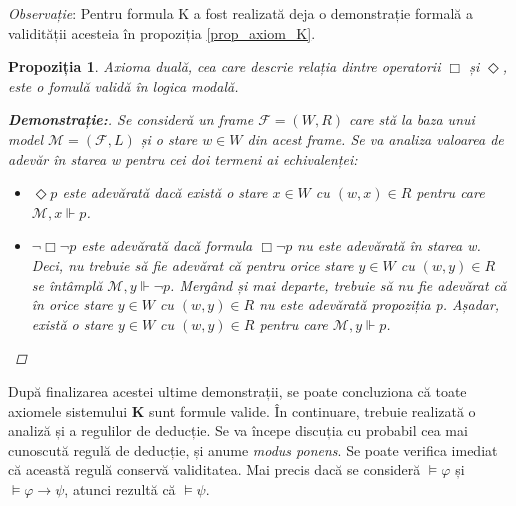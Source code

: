\documentclass[12pt, openany]{book}
\newtheorem{sentence}[definition]{Propoziția} %
\begin{document}
            \par{}
                \noindent \textit{Observație}: Pentru formula K a fost realizată deja o demonstrație formală a validității 
                acesteia în propoziția \ref{prop_axiom_K}.

            \begin{sentence}
                Axioma duală, cea care descrie relația dintre operatorii $\Box$ și $\Diamond$, este o fomulă validă în 
                logica modală.

                \begin{proof}[\textbf{Demonstrație:}]
                    Se consideră un \textit{frame} $\mathcal{F}=(W,R)$ care stă la baza unui model $\mathcal{M}=(
                    \mathcal{F},L)$ și o stare $w \in W$ din acest \textit{frame}. Se va analiza valoarea de adevăr în 
                    starea w pentru cei doi termeni ai echivalenței:
                    \begin{itemize}
                        \item $\Diamond p$ este adevărată dacă există o stare $x \in W$ cu $(w,x) \in R$ pentru care 
                        $\mathcal{M},x \Vdash p$.
                        \item $\neg \Box \neg p$ este adevărată dacă formula $\Box \neg p$ nu este adevărată în starea w. 
                        Deci, nu trebuie să fie adevărat că pentru orice stare $y \in W$ cu $(w,y) \in R$ se întâmplă 
                        $\mathcal{M},y \Vdash \neg p$. Mergând și mai departe, trebuie să nu fie adevărat că în orice stare 
                        $y \in W$ cu $(w,y) \in R$ nu este adevărată propoziția p. Așadar, există o stare $y \in W$ cu 
                        $(w,y) \in R$ pentru care $\mathcal{M},y \Vdash p$.
                    \end{itemize}
                \end{proof}
            \end{sentence}
            
            \par{}
                După finalizarea acestei ultime demonstrații, se poate concluziona că toate axiomele sistemului \textbf{K} 
                sunt formule valide. În continuare, trebuie realizată o analiză și a regulilor de deducție. 
                Se va începe discuția cu probabil cea mai cunoscută regulă de deducție, și anume \textit{modus ponens}. Se poate 
                verifica imediat că această regulă conservă validitatea. Mai precis dacă se consideră $\vDash \varphi$ și 
                $\vDash \varphi \rightarrow \psi$, atunci rezultă că $\vDash \psi$.
\end{document}

